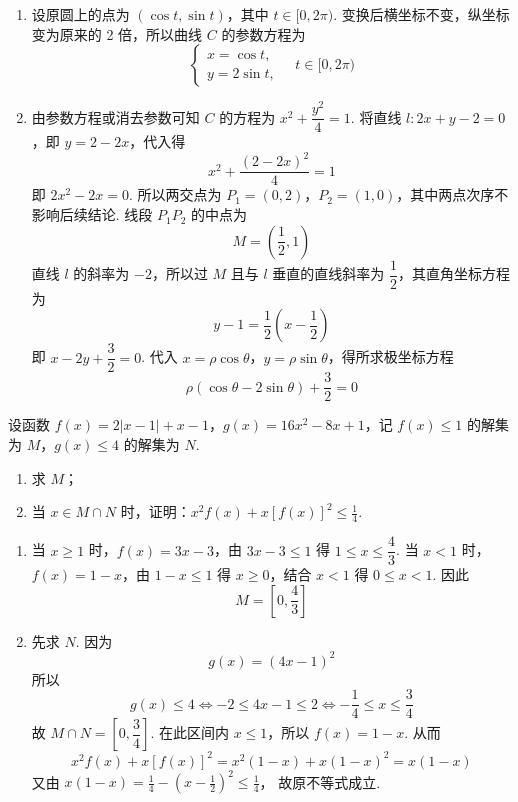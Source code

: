 \begin{solution}
\begin{enumerate}
\item 设原圆上的点为 \((\cos t,\sin t)\)，其中 \(t\in[0,2\pi)\). 变换后横坐标不变，纵坐标变为原来的 2 倍，所以曲线 \(C\) 的参数方程为
\[
\begin{cases}
x=\cos t,\\
y=2\sin t,
\end{cases}\quad t\in[0,2\pi)
\]
\item 由参数方程或消去参数可知 \(C\) 的方程为 \(x^{2}+\dfrac{y^{2}}{4}=1\). 将直线 \(l:2x+y-2=0\)，即 \(y=2-2x\)，代入得
\[
x^{2}+\frac{(2-2x)^{2}}{4}=1
\]
即 \(2x^{2}-2x=0\). 所以两交点为 \(P_{1}=(0,2)\)，\(P_{2}=(1,0)\)，其中两点次序不影响后续结论. 线段 \(P_{1}P_{2}\) 的中点为
\[
M=\left(\frac{1}{2},1\right)
\]
直线 \(l\) 的斜率为 \(-2\)，所以过 \(M\) 且与 \(l\) 垂直的直线斜率为 \(\dfrac{1}{2}\)，其直角坐标方程为
\[
y-1=\frac{1}{2}\left(x-\frac{1}{2}\right)
\]
即 \(x-2y+\dfrac{3}{2}=0\). 代入 \(x=\rho\cos\theta\)，\(y=\rho\sin\theta\)，得所求极坐标方程
\[
\rho\left(\cos\theta-2\sin\theta\right)+\frac{3}{2}=0
\]
\end{enumerate}
\end{solution}

\begin{problem}
设函数 \( f(x) = 2|x - 1| + x - 1 \)，\( g(x) = 16x^{2} - 8x + 1 \)，记 \( f(x) \leqslant 1 \) 的解集为 \(M\)，\( g(x) \leqslant 4 \) 的解集为 \(N\).
\begin{enumerate}
\item 求 \(M\)；
\item 当 \(x \in M \cap N\) 时，证明：\(x^2 f(x) + x[f(x)]^2 \leqslant \frac{1}{4}\).
\end{enumerate}
\end{problem}

\begin{solution}
\begin{enumerate}
\item 当 \(x\geqslant1\) 时，\(f(x)=3x-3\)，由 \(3x-3\leqslant1\) 得 \(1\leqslant x\leqslant\dfrac{4}{3}\). 当 \(x<1\) 时，\(f(x)=1-x\)，由 \(1-x\leqslant1\) 得 \(x\geqslant0\)，结合 \(x<1\) 得 \(0\leqslant x<1\). 因此
\[
M=\left[0,\frac{4}{3}\right]
\]
\item 先求 \(N\). 因为
\[
g(x)=(4x-1)^{2}
\]
所以
\[
g(x)\leqslant4\iff -2\leqslant4x-1\leqslant2\iff -\frac{1}{4}\leqslant x\leqslant\frac{3}{4}
\]
故 \(M\cap N=\left[0,\dfrac{3}{4}\right]\). 在此区间内 \(x\leqslant1\)，所以 \(f(x)=1-x\). 从而
\[
x^{2}f(x)+x[f(x)]^{2}=x^{2}(1-x)+x(1-x)^{2}=x(1-x)
\]
又由 \(x(1-x)=\frac{1}{4}-\left(x-\frac{1}{2}\right)^{2}\leqslant\frac{1}{4}\)，
故原不等式成立.
\end{enumerate}
\end{solution}
